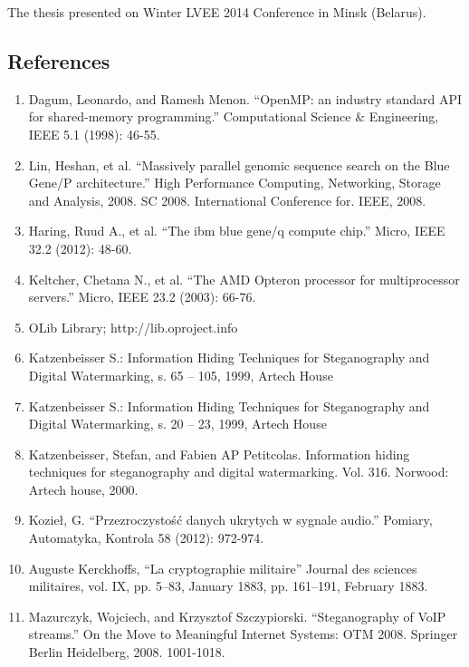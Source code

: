 \documentclass[10pt, a5paper]{article}
\begin{document}
The thesis presented on Winter LVEE 2014 Conference in Minsk (Belarus).

\subsection*{References}

\begin{enumerate}
  \item Dagum, Leonardo, and Ramesh Menon. ``OpenMP: an industry standard API for shared-memory programming.'' Computational Science \& Engineering, IEEE 5.1 (1998): 46-55.
  \item Lin, Heshan, et al. ``Massively parallel genomic sequence search on the Blue Gene/P architecture.'' High Performance Computing, Networking, Storage and Analysis, 2008. SC 2008. International Conference for. IEEE, 2008.
  \item Haring, Ruud A., et al. ``The ibm blue gene/q compute chip.'' Micro, IEEE 32.2 (2012): 48-60.
  \item Keltcher, Chetana N., et al. ``The AMD Opteron processor for multiprocessor servers.'' Micro, IEEE 23.2 (2003): 66-76.
  \item OLib Library; http://lib.oproject.info
  \item Katzenbeisser S.: Information Hiding Techniques for Steganography and Digital Watermarking, s. 65 -- 105, 1999, Artech House
  \item Katzenbeisser S.: Information Hiding Techniques for Steganography and Digital Watermarking, s. 20 -- 23, 1999, Artech House
  \item Katzenbeisser, Stefan, and Fabien AP Petitcolas. Information hiding techniques for steganography and digital watermarking. Vol. 316. Norwood: Artech house, 2000.
  \item Kozieł, G. ``Przezroczystość danych ukrytych w sygnale audio.'' Pomiary, Automatyka, Kontrola 58 (2012): 972-974.
  \item Auguste Kerckhoffs, ``La cryptographie militaire'' Journal des sciences militaires, vol. IX, pp. 5–83, January 1883, pp. 161–191, February 1883.
  \item Mazurczyk, Wojciech, and Krzysztof Szczypiorski. ``Steganography of VoIP streams.'' On the Move to Meaningful Internet Systems: OTM 2008. Springer Berlin Heidelberg, 2008. 1001-1018.
\end{enumerate}
\end{document}
